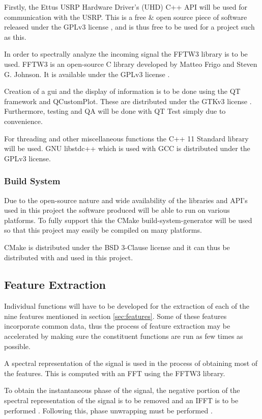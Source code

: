 \documentclass[10pt,twocolumn]{witseiepaper}
\begin{document}
			Firstly, the Ettus USRP Hardware Driver's (UHD) C++ API will be used for communication with the USRP. This is a free \& open source piece of software released under the GPLv3 license \cite{uhd_license}, and is thus free to be used for a project such as this.

			In order to spectrally analyze the incoming signal the FFTW3 library is to be used. FFTW3 is an open-source C library developed by Matteo Frigo and Steven G. Johnson. It is available under the GPLv3 license \cite{fftw3_license}.

			Creation of a gui and the display of information is to be done using the QT framework and QCustomPlot. These are distributed under the GTKv3 license \cite{qt_license, qcustomplot_license}. Furthermore, testing and QA will be done with QT Test simply due to convenience.

			For threading and other miscellaneous functions the C++ 11 Standard library will be used. GNU libstdc++ which is used with GCC is distributed under the GPLv3 license.

		\subsubsection{Build System}
			Due to the open-source nature and wide availability of the libraries and API's used in this project the software produced will be able to run on various platforms. To fully support this the CMake build-system-generator will be used so that this project may easily be compiled on many platforms.

			CMake is distributed under the BSD 3-Clause license \cite{cmake_license} and it can thus be distributed with and used in this project.

	\subsection{Feature Extraction}
		\label{sec:feat_fun}
		Individual functions will have to be developed for the extraction of each of the nine features mentioned in section \ref{sec:features}. Some of these features incorporate common data, thus the process of feature extraction may be accelerated by making sure the constituent functions are run as few times as possible.

		A spectral representation of the signal is used in the process of obtaining most of the features. This is computed with an FFT using the FFTW3 library. 
		
		To obtain the instantaneous phase of the signal, the negative portion of the spectral representation of the signal is to be removed and an IFFT is to be performed \cite{picinbono1997instantaneous}. Following this, phase unwrapping must be performed \cite{park2009introduction, picinbono1997instantaneous}.
\end{document}
